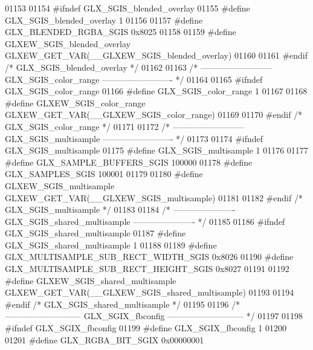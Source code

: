 \begin{DoxyCode}
01153 
01154 \textcolor{preprocessor}{#ifndef GLX\_SGIS\_blended\_overlay}
01155 \textcolor{preprocessor}{#define GLX\_SGIS\_blended\_overlay 1}
01156 
01157 \textcolor{preprocessor}{#define GLX\_BLENDED\_RGBA\_SGIS 0x8025}
01158 
01159 \textcolor{preprocessor}{#define GLXEW\_SGIS\_blended\_overlay GLXEW\_GET\_VAR(\_\_GLXEW\_SGIS\_blended\_overlay)}
01160 
01161 \textcolor{preprocessor}{#endif }\textcolor{comment}{/* GLX\_SGIS\_blended\_overlay */}\textcolor{preprocessor}{}
01162 
01163 \textcolor{comment}{/* -------------------------- GLX\_SGIS\_color\_range ------------------------- */}
01164 
01165 \textcolor{preprocessor}{#ifndef GLX\_SGIS\_color\_range}
01166 \textcolor{preprocessor}{#define GLX\_SGIS\_color\_range 1}
01167 
01168 \textcolor{preprocessor}{#define GLXEW\_SGIS\_color\_range GLXEW\_GET\_VAR(\_\_GLXEW\_SGIS\_color\_range)}
01169 
01170 \textcolor{preprocessor}{#endif }\textcolor{comment}{/* GLX\_SGIS\_color\_range */}\textcolor{preprocessor}{}
01171 
01172 \textcolor{comment}{/* -------------------------- GLX\_SGIS\_multisample ------------------------- */}
01173 
01174 \textcolor{preprocessor}{#ifndef GLX\_SGIS\_multisample}
01175 \textcolor{preprocessor}{#define GLX\_SGIS\_multisample 1}
01176 
01177 \textcolor{preprocessor}{#define GLX\_SAMPLE\_BUFFERS\_SGIS 100000}
01178 \textcolor{preprocessor}{#define GLX\_SAMPLES\_SGIS 100001}
01179 
01180 \textcolor{preprocessor}{#define GLXEW\_SGIS\_multisample GLXEW\_GET\_VAR(\_\_GLXEW\_SGIS\_multisample)}
01181 
01182 \textcolor{preprocessor}{#endif }\textcolor{comment}{/* GLX\_SGIS\_multisample */}\textcolor{preprocessor}{}
01183 
01184 \textcolor{comment}{/* ---------------------- GLX\_SGIS\_shared\_multisample ---------------------- */}
01185 
01186 \textcolor{preprocessor}{#ifndef GLX\_SGIS\_shared\_multisample}
01187 \textcolor{preprocessor}{#define GLX\_SGIS\_shared\_multisample 1}
01188 
01189 \textcolor{preprocessor}{#define GLX\_MULTISAMPLE\_SUB\_RECT\_WIDTH\_SGIS 0x8026}
01190 \textcolor{preprocessor}{#define GLX\_MULTISAMPLE\_SUB\_RECT\_HEIGHT\_SGIS 0x8027}
01191 
01192 \textcolor{preprocessor}{#define GLXEW\_SGIS\_shared\_multisample GLXEW\_GET\_VAR(\_\_GLXEW\_SGIS\_shared\_multisample)}
01193 
01194 \textcolor{preprocessor}{#endif }\textcolor{comment}{/* GLX\_SGIS\_shared\_multisample */}\textcolor{preprocessor}{}
01195 
01196 \textcolor{comment}{/* --------------------------- GLX\_SGIX\_fbconfig --------------------------- */}
01197 
01198 \textcolor{preprocessor}{#ifndef GLX\_SGIX\_fbconfig}
01199 \textcolor{preprocessor}{#define GLX\_SGIX\_fbconfig 1}
01200 
01201 \textcolor{preprocessor}{#define GLX\_RGBA\_BIT\_SGIX 0x00000001}

\end{DoxyCode}
